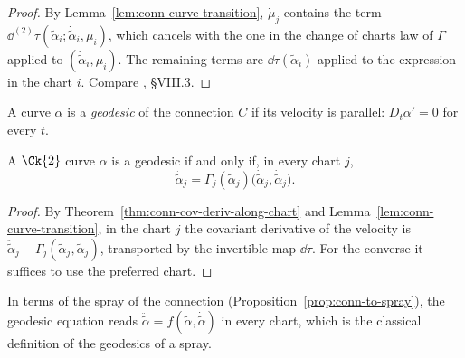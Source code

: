\begin{proof}
  \leanok
  By Lemma~\ref{lem:conn-curve-transition}, $\dot\mu_j$ contains the term
  $\dd^{(2)}\tau(\tilde\alpha_i; \dot{\tilde\alpha}_i, \mu_i)$, which cancels with the one in the
  change of charts law of $\Gamma$ applied to $(\dot{\tilde\alpha}_i, \mu_i)$. The remaining
  terms are $\dd\tau(\tilde\alpha_i)$ applied to the expression in the chart $i$. Compare
  \cite{Lan99}, \S VIII.3.
\end{proof}

\begin{definition}[Geodesic]
  \label{def:geodesic}
  \leanok
  A curve $\alpha$ is a \emph{geodesic} of the connection $C$ if its velocity is parallel:
  $D_t \alpha' = 0$ for every $t$.
\end{definition}

\begin{theorem}
  \label{thm:conn-geodesic-equation}
  \leanok
  A $\Ck{2}$ curve $\alpha$ is a geodesic if and only if, in every chart $j$,
  \[
    \ddot{\tilde\alpha}_j = \Gamma_j(\tilde\alpha_j)\bigl(\dot{\tilde\alpha}_j, \dot{\tilde\alpha}_j\bigr).
  \]
\end{theorem}

\begin{proof}
  \leanok
  By Theorem~\ref{thm:conn-cov-deriv-along-chart} and Lemma~\ref{lem:conn-curve-transition}, in
  the chart $j$ the covariant derivative of the velocity is
  $\ddot{\tilde\alpha}_j - \Gamma_j(\dot{\tilde\alpha}_j, \dot{\tilde\alpha}_j)$, transported by
  the invertible map $\dd\tau$. For the converse it suffices to use the preferred chart.
\end{proof}

In terms of the spray of the connection (Proposition~\ref{prop:conn-to-spray}), the geodesic
equation reads $\ddot{\tilde\alpha} = f(\tilde\alpha, \dot{\tilde\alpha})$ in every chart, which is
the classical definition of the geodesics of a spray.


